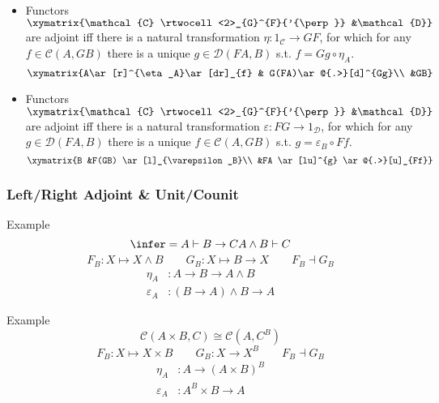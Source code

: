 \documentclass[UTF8,aspectratio=43,11pt,colorlinks,compress,openany]{beamer}%
\begin{document}
\begin{frame}\frametitle{}
\begin{itemize}
\item Functors $\xymatrix{\mathcal{C} \rtwocell<2>_{G}^{F}{'{\perp}} &\mathcal{D}}$ are adjoint iff there is a natural transformation $\eta: 1_\mathcal{C}\to GF$, for which for any $f\in\mathcal{C}(A,GB)$ there is a unique $g\in\mathcal{D}(FA,B)$ s.t. $f=Gg\circ\eta_A$.
\[\xymatrix{A\ar[r]^{\eta_A}\ar[dr]_{f} & G(FA)\ar@{.>}[d]^{Gg}\\ &GB}\]
\item Functors $\xymatrix{\mathcal{C} \rtwocell<2>_{G}^{F}{'{\perp}} &\mathcal{D}}$ are adjoint iff there is a natural transformation $\varepsilon: FG\to 1_\mathcal{D}$, for which for any $g\in\mathcal{D}(FA,B)$ there is a unique $f\in\mathcal{C}(A,GB)$ s.t. $g=\varepsilon_B\circ Ff$.
\[\xymatrix{B &F(GB) \ar[l]_{\varepsilon_B}\\
&FA \ar[lu]^{g} \ar@{.>}[u]_{Ff}}\]
\end{itemize}
\end{frame}

\begin{frame}\frametitle{Left/Right Adjoint \& Unit/Counit}
\setlength\abovedisplayskip{0pt}
\setlength\belowdisplayskip{0pt}
\begin{block}{Example}
\[\infer={A\vdash B\to C}{A\wedge B\vdash C}\]
\[F_B: X\mapsto X\wedge B\qquad G_B: X\mapsto B\to X\qquad F_B\dashv G_B\]
\begin{align*}
	\eta_A&: A\to B\to A\wedge B\\
	\varepsilon_A&: (B\to A)\wedge B\to A
\end{align*}
\end{block}
\begin{block}{Example}
	\[\mathcal{C}(A\times B,C)\cong\mathcal{C}(A,C^B)\]
	\[F_B: X\mapsto X\times B\qquad G_B: X\to X^B\qquad F_B\dashv G_B\]
\begin{align*}
	\eta_A&: A\to (A\times B)^B\\
	\varepsilon_A&: A^B\times B\to A
\end{align*}
\end{block}
\end{frame}
\end{document}
